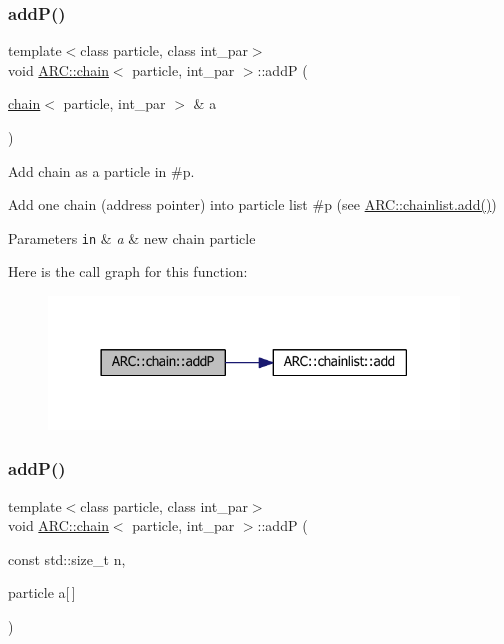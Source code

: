 \subsubsection{\texorpdfstring{add\+P()}{addP()}\hspace{0.1cm}{\footnotesize\ttfamily [2/3]}}
{\footnotesize\ttfamily template$<$class particle, class int\+\_\+par$>$ \\
void \hyperlink{classARC_1_1chain}{A\+R\+C\+::chain}$<$ particle, int\+\_\+par $>$\+::addP (\begin{DoxyParamCaption}\item[{\hyperlink{classARC_1_1chain}{chain}$<$ particle, int\+\_\+par $>$ \&}]{a }\end{DoxyParamCaption})\hspace{0.3cm}{\ttfamily [inline]}}



Add chain as a particle in \#p. 

Add one chain (address pointer) into particle list \#p (see \hyperlink{classARC_1_1chainlist_ab04a5742cd27168e0404e57a67d6afd1}{A\+R\+C\+::chainlist.\+add()}) 
\begin{DoxyParams}[1]{Parameters}
\mbox{\tt in}  & {\em a} & new chain particle \\
\hline
\end{DoxyParams}
Here is the call graph for this function\+:
\nopagebreak
\begin{figure}[H]
\begin{center}
\leavevmode
\includegraphics[width=309pt]{classARC_1_1chain_abf446295cee9e550c32d64e575f68d04_cgraph}
\end{center}
\end{figure}
\hypertarget{classARC_1_1chain_a2cd246cb307b8f04766c625de851ff52}{}\label{classARC_1_1chain_a2cd246cb307b8f04766c625de851ff52} 
\subsubsection{\texorpdfstring{add\+P()}{addP()}\hspace{0.1cm}{\footnotesize\ttfamily [3/3]}}
{\footnotesize\ttfamily template$<$class particle, class int\+\_\+par$>$ \\
void \hyperlink{classARC_1_1chain}{A\+R\+C\+::chain}$<$ particle, int\+\_\+par $>$\+::addP (\begin{DoxyParamCaption}\item[{const std\+::size\+\_\+t}]{n,  }\item[{particle}]{a\mbox{[}$\,$\mbox{]} }\end{DoxyParamCaption})\hspace{0.3cm}{\ttfamily [inline]}}



